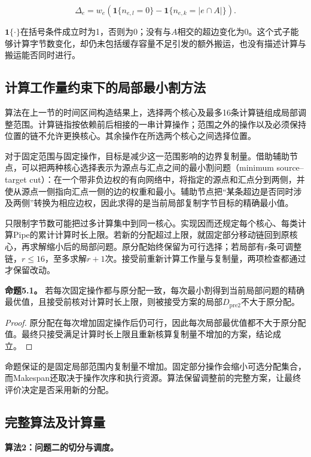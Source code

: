 \documentclass[anonymous,notoc]{gmcm2026}
\begin{document}
\[\Delta_e=w_e\left(\mathbf1\{n_{e,l}=0\}-\mathbf1\{n_{e,k}=|e\cap A|\}\right).\]

\(\mathbf1\{\cdot\}\)在括号条件成立时为1，否则为0；没有与\(A\)相交的超边变化为0。这个式子能够计算字节数变化，却仍未包括缓存容量不足引发的额外搬运，也没有描述计算与搬运能否同时进行。

\subsection{计算工作量约束下的局部最小割方法}

算法在上一节的时间区间构造结果上，选择两个核心及最多16条计算链组成局部调整范围。计算链指按依赖前后相接的一串计算操作；范围之外的操作以及必须保持位置的链不允许更换核心。其余操作在所选两个核心之间选择位置。

对于固定范围与固定操作，目标是减少这一范围影响的边界复制量。借助辅助节点，可以把两种核心选择表示为源点与汇点之间的最小割问题（minimum source--target cut）：在一个带非负边权的有向网络中，将指定的源点和汇点分到两侧，并使从源点一侧指向汇点一侧的边的权重和最小。辅助节点把``某条超边是否同时涉及两侧''转换为相应边权，因此求得的是当前局部复制字节目标的精确最小值。

只限制字节数可能把过多计算集中到同一核心。实现因而还规定每个核心、每类计算Pipe的累计计算时长上限。若新的分配超过上限，就固定部分移动链回到原核心，再求解缩小后的局部问题。原分配始终保留为可行选择；若局部有\(r\)条可调整链，\(r\le16\)，至多求解\(r+1\)次。接受前重新计算工作量与复制量，两项检查都通过才保留改动。

\textbf{命题5.1。} 若每次固定操作都与原分配一致，每次最小割得到当前局部问题的精确最优值，且接受前核对计算时长上限，则被接受方案的局部\(D_{\mathrm{pre2}}\)不大于原分配。

\begin{proof} 原分配在每次增加固定操作后仍可行，因此每次局部最优值都不大于原分配值。最终只接受满足计算时长上限且重新核算复制量不增加的方案，结论成立。\end{proof}

命题保证的是固定局部范围内复制量不增加。固定部分操作会缩小可选分配集合，而Makespan还取决于操作次序和执行资源。算法保留调整前的完整方案，让最终评价决定是否采用新的分配。

\subsection{完整算法及计算量}

\textbf{算法2：问题二的切分与调度。}
\end{document}
